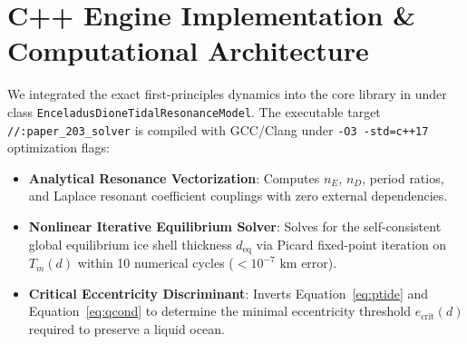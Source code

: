 \documentclass[11pt,a4paper]{article}
\begin{document}
\section{C++ Engine Implementation \& Computational Architecture}
We integrated the exact first-principles dynamics into the core library in  under class \texttt{EnceladusDioneTidalResonanceModel}. The executable target \texttt{//:paper\_203\_solver} is compiled with GCC/Clang under \texttt{-O3 -std=c++17} optimization flags:

\begin{itemize}
    \item \textbf{Analytical Resonance Vectorization}: Computes $n_E$, $n_D$, period ratios, and Laplace resonant coefficient couplings with zero external dependencies.
    \item \textbf{Nonlinear Iterative Equilibrium Solver}: Solves for the self-consistent global equilibrium ice shell thickness $d_{\text{eq}}$ via Picard fixed-point iteration on $T_m(d)$ within 10 numerical cycles ($< 10^{-7}\text{ km}$ error).
    \item \textbf{Critical Eccentricity Discriminant}: Inverts Equation~\ref{eq:ptide} and Equation~\ref{eq:qcond} to determine the minimal eccentricity threshold $e_{\text{crit}}(d)$ required to preserve a liquid ocean.
\end{itemize}
\end{document}
